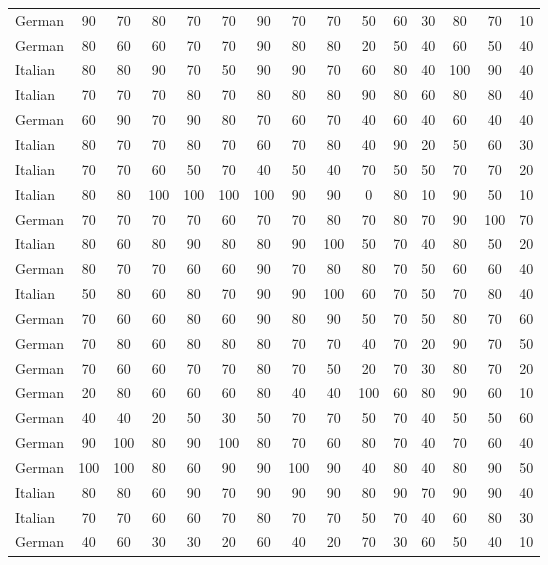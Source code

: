 \begin{table}[htbp]
\begin{tabular}{lcccccccccccccc}
German & 90 & 70 & 80 & 70 & 70 & 90 & 70 & 70 & 50 & 60 & 30 & 80 & 70 & 10 \\
German & 80 & 60 & 60 & 70 & 70 & 90 & 80 & 80 & 20 & 50 & 40 & 60 & 50 & 40 \\
Italian & 80 & 80 & 90 & 70 & 50 & 90 & 90 & 70 & 60 & 80 & 40 & 100 & 90 & 40 \\
Italian & 70 & 70 & 70 & 80 & 70 & 80 & 80 & 80 & 90 & 80 & 60 & 80 & 80 & 40 \\
German & 60 & 90 & 70 & 90 & 80 & 70 & 60 & 70 & 40 & 60 & 40 & 60 & 40 & 40 \\
Italian & 80 & 70 & 70 & 80 & 70 & 60 & 70 & 80 & 40 & 90 & 20 & 50 & 60 & 30 \\
Italian & 70 & 70 & 60 & 50 & 70 & 40 & 50 & 40 & 70 & 50 & 50 & 70 & 70 & 20 \\
Italian & 80 & 80 & 100 & 100 & 100 & 100 & 90 & 90 & 0 & 80 & 10 & 90 & 50 & 10 \\
German & 70 & 70 & 70 & 70 & 60 & 70 & 70 & 80 & 70 & 80 & 70 & 90 & 100 & 70 \\
Italian & 80 & 60 & 80 & 90 & 80 & 80 & 90 & 100 & 50 & 70 & 40 & 80 & 50 & 20 \\
German & 80 & 70 & 70 & 60 & 60 & 90 & 70 & 80 & 80 & 70 & 50 & 60 & 60 & 40 \\
Italian & 50 & 80 & 60 & 80 & 70 & 90 & 90 & 100 & 60 & 70 & 50 & 70 & 80 & 40 \\
German & 70 & 60 & 60 & 80 & 60 & 90 & 80 & 90 & 50 & 70 & 50 & 80 & 70 & 60 \\
German & 70 & 80 & 60 & 80 & 80 & 80 & 70 & 70 & 40 & 70 & 20 & 90 & 70 & 50 \\
German & 70 & 60 & 60 & 70 & 70 & 80 & 70 & 50 & 20 & 70 & 30 & 80 & 70 & 20 \\
German & 20 & 80 & 60 & 60 & 60 & 80 & 40 & 40 & 100 & 60 & 80 & 90 & 60 & 10 \\
German & 40 & 40 & 20 & 50 & 30 & 50 & 70 & 70 & 50 & 70 & 40 & 50 & 50 & 60 \\
German & 90 & 100 & 80 & 90 & 100 & 80 & 70 & 60 & 80 & 70 & 40 & 70 & 60 & 40 \\
German & 100 & 100 & 80 & 60 & 90 & 90 & 100 & 90 & 40 & 80 & 40 & 80 & 90 & 50 \\
Italian & 80 & 80 & 60 & 90 & 70 & 90 & 90 & 90 & 80 & 90 & 70 & 90 & 90 & 40 \\
Italian & 70 & 70 & 60 & 60 & 70 & 80 & 70 & 70 & 50 & 70 & 40 & 60 & 80 & 30 \\
German & 40 & 60 & 30 & 30 & 20 & 60 & 40 & 20 & 70 & 30 & 60 & 50 & 40 & 10 \\

\end{tabular}
\end{table}
